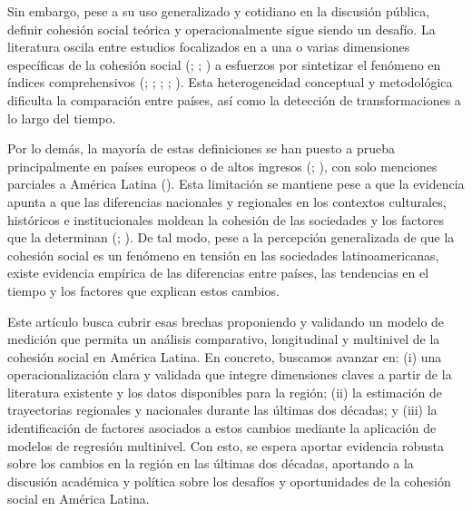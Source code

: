 \documentclass[
  spanish,
  letterpaper,
  DIV=11,
  numbers=noendperiod]{scrartcl}
\begin{document}
Sin embargo, pese a su uso generalizado y cotidiano en la discusión
pública, definir cohesión social teórica y operacionalmente sigue siendo
un desafío. La literatura oscila entre estudios focalizados en a una o
varias dimensiones específicas de la cohesión social
(;
; ) a esfuerzos por sintetizar el fenómeno en índices
comprehensivos (; ;
;
;
). Esta heterogeneidad
conceptual y metodológica dificulta la comparación entre países, así
como la detección de transformaciones a lo largo del tiempo.

Por lo demás, la mayoría de estas definiciones se han puesto a prueba
principalmente en países europeos o de altos ingresos
(;
), con solo
menciones parciales a América Latina
(). Esta limitación se
mantiene pese a que la evidencia apunta a que las diferencias nacionales
y regionales en los contextos culturales, históricos e institucionales
moldean la cohesión de las sociedades y los factores que la determinan
(;
). De tal
modo, pese a la percepción generalizada de que la cohesión social es un
fenómeno en tensión en las sociedades latinoamericanas, existe evidencia
empírica de las diferencias entre países, las tendencias en el tiempo y
los factores que explican estos cambios.

Este artículo busca cubrir esas brechas proponiendo y validando un
modelo de medición que permita un análisis comparativo, longitudinal y
multinivel de la cohesión social en América Latina. En concreto,
buscamos avanzar en: (i) una operacionalización clara y validada que
integre dimensiones claves a partir de la literatura existente y los
datos disponibles para la región; (ii) la estimación de trayectorias
regionales y nacionales durante las últimas dos décadas; y (iii) la
identificación de factores asociados a estos cambios mediante la
aplicación de modelos de regresión multinivel. Con esto, se espera
aportar evidencia robusta sobre los cambios en la región en las últimas
dos décadas, aportando a la discusión académica y política sobre los
desafíos y oportunidades de la cohesión social en América Latina.
\end{document}
